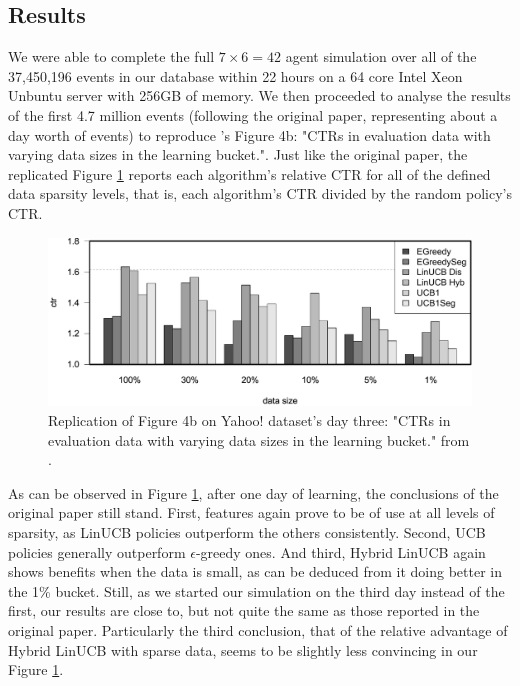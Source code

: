 \documentclass{jss}
\begin{document}
\subsection{Results} \label{rslts}

We were able to complete the full $7\times6=42$ agent simulation over all of the 37,450,196 events in our database within 22 hours on a 64 core Intel Xeon Unbuntu server with 256GB of memory. We then proceeded to analyse the results of the first 4.7 million events (following the original paper, representing about a day worth of events) to reproduce \cite{Li2010}'s Figure 4b: "CTRs in evaluation data with varying data sizes in the learning bucket.". Just like the original paper, the replicated Figure \ref{fig:section_8_bar} reports each algorithm’s relative CTR for all of the defined data sparsity levels, that is, each algorithm’s CTR divided by the random policy’s CTR.

\begin{figure}[H]
  \centering
    \includegraphics[width=.99\textwidth]{fig/section_8_bar}
      \caption{Replication of Figure 4b on Yahoo! dataset's day three: "CTRs in evaluation data with varying data sizes in the learning bucket." from \cite{Li2010}.}
      \label{fig:section_8_bar}
\end{figure}

As can be observed in Figure \ref{fig:section_8_bar}, after one day of learning, the conclusions of the original paper still stand. First, features again prove to be of use at all levels of sparsity, as LinUCB policies outperform the others consistently. Second, UCB policies generally outperform $\epsilon$-greedy ones. And third, Hybrid LinUCB again shows benefits when the data is small, as can be deduced from it doing better in the 1\% bucket. Still, as we started our simulation on the third day instead of the first, our results are close to, but not quite the same as those reported in the original paper. Particularly the third conclusion, that of the relative advantage of Hybrid LinUCB with sparse data, seems to be slightly less convincing in our Figure \ref{fig:section_8_bar}.
\end{document}
